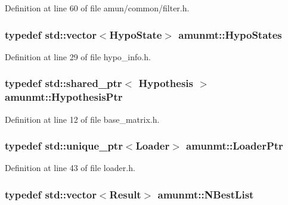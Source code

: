 Definition at line 60 of file amun/common/filter.\+h.

\subsubsection[{\texorpdfstring{Hypo\+States}{HypoStates}}]{\setlength{\rightskip}{0pt plus 5cm}typedef std\+::vector$<${\bf Hypo\+State}$>$ {\bf amunmt\+::\+Hypo\+States}}\hypertarget{namespaceamunmt_acca30714a48f384cccf36370d6869b40}{}\label{namespaceamunmt_acca30714a48f384cccf36370d6869b40}


Definition at line 29 of file hypo\+\_\+info.\+h.

\subsubsection[{\texorpdfstring{Hypothesis\+Ptr}{HypothesisPtr}}]{\setlength{\rightskip}{0pt plus 5cm}typedef std\+::shared\+\_\+ptr$<$ {\bf Hypothesis} $>$ {\bf amunmt\+::\+Hypothesis\+Ptr}}\hypertarget{namespaceamunmt_a9dd9d255e51649b0af19d0e895d52d2f}{}\label{namespaceamunmt_a9dd9d255e51649b0af19d0e895d52d2f}


Definition at line 12 of file base\+\_\+matrix.\+h.

\subsubsection[{\texorpdfstring{Loader\+Ptr}{LoaderPtr}}]{\setlength{\rightskip}{0pt plus 5cm}typedef std\+::unique\+\_\+ptr$<${\bf Loader}$>$ {\bf amunmt\+::\+Loader\+Ptr}}\hypertarget{namespaceamunmt_a7907c3626488deed31e31452d178d78e}{}\label{namespaceamunmt_a7907c3626488deed31e31452d178d78e}


Definition at line 43 of file loader.\+h.

\subsubsection[{\texorpdfstring{N\+Best\+List}{NBestList}}]{\setlength{\rightskip}{0pt plus 5cm}typedef std\+::vector$<${\bf Result}$>$ {\bf amunmt\+::\+N\+Best\+List}}\hypertarget{namespaceamunmt_a4ad8f6c25b18c8675040456c6e95e0f6}{}\label{namespaceamunmt_a4ad8f6c25b18c8675040456c6e95e0f6}


